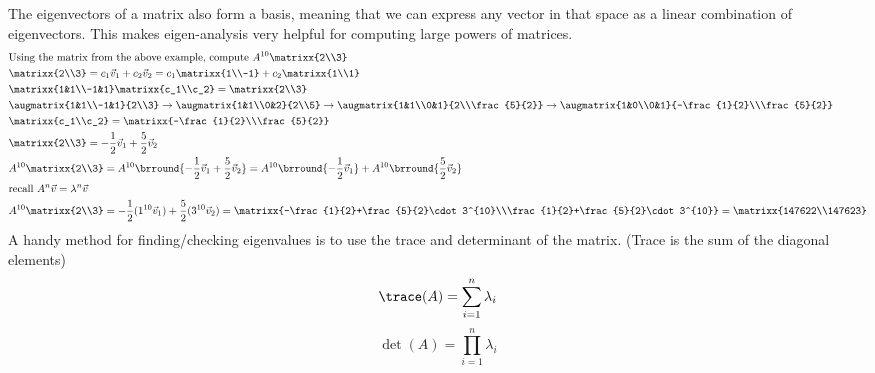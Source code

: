 The eigenvectors of a matrix also form a basis, meaning that we can express any vector in that space as a linear combination of eigenvectors. This makes eigen-analysis very helpful for computing large powers of matrices.
\begin{align*}
    &\text{Using the matrix from the above example, compute }A^{10}\matrixx{2\\3}\\
    &\matrixx{2\\3}=c_1\vec{v}_1+c_2\vec{v}_2=c_1\matrixx{1\\-1}+c_2\matrixx{1\\1}\\
    &\matrixx{1&1\\-1&1}\matrixx{c_1\\c_2}=\matrixx{2\\3}\\
    &\augmatrix{1&1\\-1&1}{2\\3}\to\augmatrix{1&1\\0&2}{2\\5}\to\augmatrix{1&1\\0&1}{2\\\frac{5}{2}}\to\augmatrix{1&0\\0&1}{-\frac{1}{2}\\\frac{5}{2}}\\
    &\matrixx{c_1\\c_2}=\matrixx{-\frac{1}{2}\\\frac{5}{2}}\\
    &\matrixx{2\\3}=-\frac{1}{2}\vec{v}_1+\frac{5}{2}\vec{v}_2\\
    &A^{10}\matrixx{2\\3}=A^{10}\brround{-\frac{1}{2}\vec{v}_1+\frac{5}{2}\vec{v}_2}=A^{10}\brround{-\frac{1}{2}\vec{v}_1}+A^{10}\brround{\frac{5}{2}\vec{v}_2}\\
    &\text{recall }A^n\vec{v}=\lambda^n\vec{v}\\
    &A^{10}\matrixx{2\\3}=-\frac{1}{2}(1^{10}\vec{v}_1)+\frac{5}{2}(3^{10}\vec{v}_2)=\matrixx{-\frac{1}{2}+\frac{5}{2}\cdot 3^{10}\\\frac{1}{2}+\frac{5}{2}\cdot 3^{10}}=\matrixx{147622\\147623}
\end{align*}
A handy method for finding/checking eigenvalues is to use the trace and determinant of the matrix. (Trace is the sum of the diagonal elements)
$$\trace(A)=\sum_{i=1}^n\lambda_i$$
$$\det(A)=\prod_{i=1}^n\lambda_i$$
